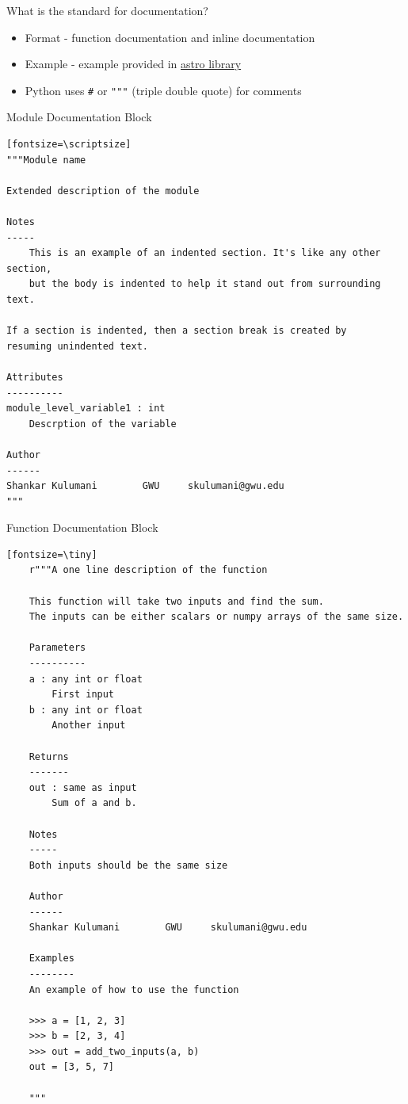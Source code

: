 \documentclass[11pt,professionalfonts]{beamer}
\begin{document}
\begin{frame}{What is the standard for documentation?}
\begin{itemize}
    \item Format - function documentation and inline documentation
    \item Example - example provided in \href{https://github.com/fdcl-gwu/MAE3145_library}{astro library}
    \item Python uses \texttt{\#} or \texttt{"""} (triple double quote) for comments
\end{itemize}
\end{frame}

\begin{frame}[fragile]{Module Documentation Block}
    \begin{verbatim}[fontsize=\scriptsize]
"""Module name

Extended description of the module

Notes
-----
    This is an example of an indented section. It's like any other section,
    but the body is indented to help it stand out from surrounding text.

If a section is indented, then a section break is created by
resuming unindented text.

Attributes
----------
module_level_variable1 : int
    Descrption of the variable

Author
------
Shankar Kulumani		GWU		skulumani@gwu.edu
"""
    \end{verbatim}
\end{frame}

\begin{frame}[fragile]{Function Documentation Block}
    \begin{verbatim}[fontsize=\tiny]
    r"""A one line description of the function

    This function will take two inputs and find the sum. 
    The inputs can be either scalars or numpy arrays of the same size.

    Parameters
    ----------
    a : any int or float  
        First input
    b : any int or float
        Another input

    Returns
    -------
    out : same as input
        Sum of a and b.

    Notes
    -----
    Both inputs should be the same size

    Author
    ------
    Shankar Kulumani		GWU		skulumani@gwu.edu

    Examples
    --------
    An example of how to use the function

    >>> a = [1, 2, 3]
    >>> b = [2, 3, 4]
    >>> out = add_two_inputs(a, b)
    out = [3, 5, 7]

    """
    \end{verbatim}
\end{frame}
\end{document}

